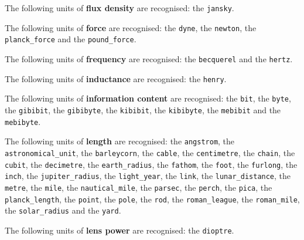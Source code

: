 \noindent The following units of {\bf flux density} are recognised:\newline
\noindent the {\tt jansky}.\vspace{5mm}

\noindent The following units of {\bf force} are recognised:\newline
\noindent the {\tt dyne}, the {\tt newton}, the {\tt planck\_\-force} and the {\tt pound\_\-force}.\vspace{5mm}

\noindent The following units of {\bf frequency} are recognised:\newline
\noindent the {\tt becquerel} and the {\tt hertz}.\vspace{5mm}

\noindent The following units of {\bf inductance} are recognised:\newline
\noindent the {\tt henry}.\vspace{5mm}

\noindent The following units of {\bf information content} are recognised:\newline
\noindent the {\tt bit}, the {\tt byte}, the {\tt gibibit}, the {\tt gibibyte}, the {\tt kibibit}, the {\tt kibibyte}, the {\tt mebibit} and the {\tt mebibyte}.\vspace{5mm}

\noindent The following units of {\bf length} are recognised:\newline
\noindent the {\tt angstrom}, the {\tt astronomical\_\-unit}, the {\tt barleycorn}, the {\tt cable}, the {\tt centimetre}, the {\tt chain}, the {\tt cubit}, the {\tt decimetre}, the {\tt earth\_\-radius}, the {\tt fathom}, the {\tt foot}, the {\tt furlong}, the {\tt inch}, the {\tt jupiter\_\-radius}, the {\tt light\_\-year}, the {\tt link}, the {\tt lunar\_\-distance}, the {\tt metre}, the {\tt mile}, the {\tt nautical\_\-mile}, the {\tt parsec}, the {\tt perch}, the {\tt pica}, the {\tt planck\_\-length}, the {\tt point}, the {\tt pole}, the {\tt rod}, the {\tt roman\_\-league}, the {\tt roman\_\-mile}, the {\tt solar\_\-radius} and the {\tt yard}.\vspace{5mm}

\noindent The following units of {\bf lens power} are recognised:\newline
\noindent the {\tt dioptre}.\vspace{5mm}

